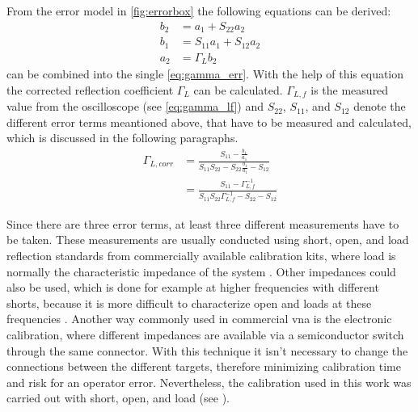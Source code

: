 \documentclass[12pt,a4paper,parskip=full,abstract=true,BCOR=12mm,twoside,open=right]{scrreprt}
\begin{document}
From the error model in \cref{fig:errorbox} the following equations can be derived:
\begin{align}
    \label{eq:b2} b_{2} & = a_{1} + S_{22} a_{2}\\
    \label{eq:b1} b_{1} & = S_{11} a_{1} + S_{12} a_{2} \\
    \label{eq:a2} a_{2} & = \Gamma_L b_{2}
\end{align}
 can be combined into the single \cref{eq:gamma_err}.
With the help of this equation the corrected reflection coefficient $\Gamma_L$ can be calculated.
$\Gamma_{L,f}$ is the measured value from the oscilloscope (see \cref{eq:gamma_lf}) and $S_{22}$, $S_{11}$, and $S_{12}$ denote the different
error terms meantioned above, that have to be measured and calculated, which is discussed in the following paragraphs.
\begin{equation}\label{eq:gamma_err}
    \begin{split}
        \Gamma_{L,corr} & = \frac{S_{11} - \frac{b_1}{a_1}}{S_{11} S_{22} - S_{22}\frac{b_1}{a_1} - S_{12}} \\
                        & = \frac{S_{11} - \Gamma_{L,f}^{-1}}{S_{11} S_{22}\Gamma_{L,f}^{-1} - S_{22} - S_{12}}
    \end{split}
\end{equation}

Since there are three error terms, at least three different measurements have
to be taken. These measurements are usually conducted using short, open, and load reflection standards from commercially available calibration kits,
where load is normally the characteristic impedance of the system \cite{agilent_an_1287-3}.
Other impedances could also be used, which is done for example at higher frequencies
with different shorts, because it is more difficult to characterize open and
loads at these frequencies \cite{anritsu_cal}. Another way commonly used in
commercial \gls{vna} is the electronic calibration, where different impedances
are available via a semiconductor switch through the same connector. With this
technique it isn't necessary to change the connections between the different
targets, therefore minimizing calibration time and risk for an operator error.
Nevertheless, the calibration used in this work was carried out with short, open, and load (see
).
\end{document}
